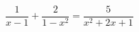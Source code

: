 \begin{ex}[type=equation]
	\begin{condition}
		\( \dfrac{1}{x-1}+\dfrac{2}{1-x^2}=\dfrac{5}{x^2+2x+1} \)
	\end{condition}
\end{ex}